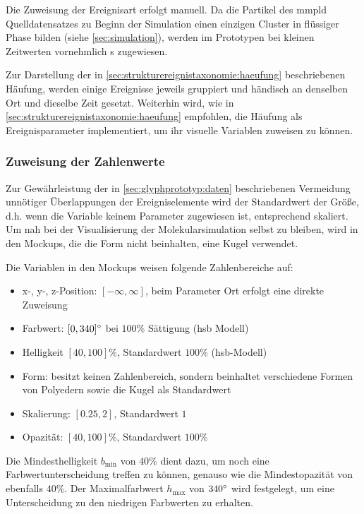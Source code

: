 Die Zuweisung der Ereignisart erfolgt manuell. Da die Partikel des \gls{mmpld} Quelldatensatzes zu Beginn der Simulation einen einzigen Cluster in flüssiger Phase bilden (siehe \autoref{sec:simulation}), werden im Prototypen bei kleinen Zeitwerten vornehmlich s zugewiesen.

Zur Darstellung der in \autoref{sec:strukturereignistaxonomie:haeufung} beschriebenen Häufung, %
werden einige Ereignisse jeweils gruppiert und händisch an denselben Ort und dieselbe Zeit gesetzt. Weiterhin wird, wie in \autoref{sec:strukturereignistaxonomie:haeufung} empfohlen, die Häufung als Ereignisparameter implementiert, um ihr visuelle Variablen zuweisen zu können.

\subsubsection*{Zuweisung der Zahlenwerte}
Zur Gewährleistung der in \autoref{sec:glyphprototyp:daten} beschriebenen Vermeidung unnötiger Überlappungen der Ereigniselemente wird der Standardwert der  Größe, d.h. wenn die Variable keinem Parameter zugewiesen ist, entsprechend skaliert. Um nah bei der Visualisierung der Molekularsimulation selbst zu bleiben, wird in den Mockups, die die  Form nicht beinhalten, eine Kugel verwendet. 

Die Variablen in den Mockups weisen folgende Zahlenbereiche auf:
\begin{itemize}
	\item x-, y-, z-Position: $[-\infty, \infty]$, beim Parameter Ort erfolgt eine direkte Zuweisung 
	\item Farbwert: $[0, 340]\degree$ bei $100\%$ Sättigung (\gls{hsb} Modell)
	\item Helligkeit $[40, 100]\%$, Standardwert $100\%$ (\gls{hsb}-Modell)
	\item Form: besitzt keinen Zahlenbereich, sondern beinhaltet verschiedene Formen von Polyedern sowie die Kugel als Standardwert
	\item Skalierung: $[0.25,2]$, Standardwert $1$
	\item Opazität: $[40, 100]\%$, Standardwert $100\%$
\end{itemize}
Die Mindesthelligkeit $b_{\text{min}}$ von $40\%$ dient dazu, um noch eine Farbwertunterscheidung treffen zu können, genauso wie die Mindestopazität von ebenfalls $40\%$. Der Maximalfarbwert $h_{\text{max}}$ von $340\degree$ wird festgelegt, um eine Unterscheidung zu den niedrigen Farbwerten zu erhalten.

